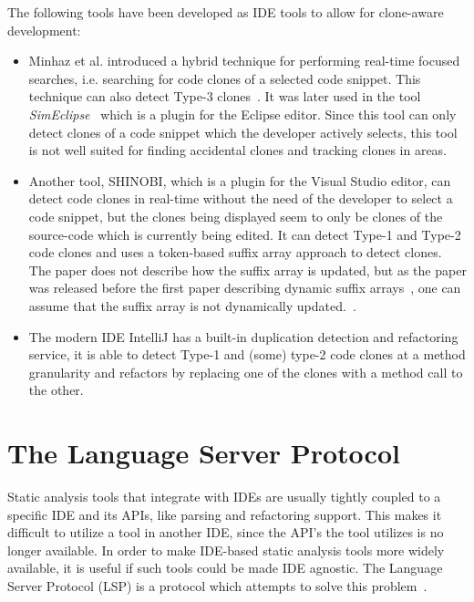 The following tools have been developed as IDE tools to allow for clone-aware development:

\begin{itemize}

	\item Minhaz et al. introduced a hybrid technique for performing real-time focused
	      searches, i.e. searching for code clones of a selected code snippet. This
	      technique can also detect Type-3 clones~\cite{Zibran_real_time_search}. It was
	      later used in the tool
	      \textit{SimEclipse}~\cite{Udding_Towards_Convenient_Management} which is a plugin
	      for the Eclipse editor. Since this tool can only detect clones of a code snippet
	      which the developer actively selects, this tool is not well suited for finding
	      accidental clones and tracking clones in areas.

    \item Another tool, SHINOBI, which is a plugin for the Visual Studio editor, can
        detect code clones in real-time without the need of the developer to select a code
        snippet, but the clones being displayed seem to only be clones of the source-code
        which is currently being edited. It can detect Type-1 and Type-2 code clones and
        uses a token-based suffix array approach to detect clones. The paper does not
        describe how the suffix array is updated, but as the paper was released before the
        first paper describing dynamic suffix arrays~\cite{DynamicExtendedSuffixArrays},
        one can assume that the suffix array is not dynamically updated.~\cite{SHINOBI}.

	\item The modern IDE IntelliJ has a built-in duplication detection and refactoring
	      service, it is able to detect Type-1 and (some) type-2 code clones at a method
	      granularity and refactors by replacing one of the clones with a method call to the
	      other.

\end{itemize}

\section{The Language Server Protocol}

Static analysis tools that integrate with IDEs are usually tightly coupled to a specific
IDE and its APIs, like parsing and refactoring support. This makes it difficult to utilize
a tool in another IDE, since the API's the tool utilizes is no longer available. In order
to make IDE-based static analysis tools more widely available, it is useful if such tools
could be made IDE agnostic. The Language Server Protocol (LSP) is a protocol which
attempts to solve this problem~\cite{lsp}.

